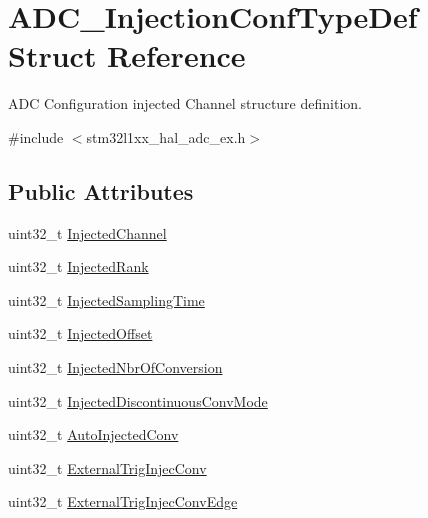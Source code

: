 \hypertarget{struct_a_d_c___injection_conf_type_def}{\section{A\-D\-C\-\_\-\-Injection\-Conf\-Type\-Def Struct Reference}
\label{struct_a_d_c___injection_conf_type_def}
}


A\-D\-C Configuration injected Channel structure definition.  




{\ttfamily \#include $<$stm32l1xx\-\_\-hal\-\_\-adc\-\_\-ex.\-h$>$}

\subsection*{Public Attributes}
\begin{DoxyCompactItemize}
\item 
uint32\-\_\-t \hyperlink{struct_a_d_c___injection_conf_type_def_aad0cab6ed3f66e8ffa4bd0490298b715}{Injected\-Channel}
\item 
uint32\-\_\-t \hyperlink{struct_a_d_c___injection_conf_type_def_af8a1717c0f5a5d0c7a705224f28a844f}{Injected\-Rank}
\item 
uint32\-\_\-t \hyperlink{struct_a_d_c___injection_conf_type_def_a3d15c0590dbafc9e99e21ea4df5b0c6b}{Injected\-Sampling\-Time}
\item 
uint32\-\_\-t \hyperlink{struct_a_d_c___injection_conf_type_def_ac7d28d71ec3aec4d1587ee04fc585f09}{Injected\-Offset}
\item 
uint32\-\_\-t \hyperlink{struct_a_d_c___injection_conf_type_def_ac59f9795b1b8c4ce6745d99f8231b768}{Injected\-Nbr\-Of\-Conversion}
\item 
uint32\-\_\-t \hyperlink{struct_a_d_c___injection_conf_type_def_adf871acec9ab869d14b5d58e1549739b}{Injected\-Discontinuous\-Conv\-Mode}
\item 
uint32\-\_\-t \hyperlink{struct_a_d_c___injection_conf_type_def_ab0e74342214a5610e6b4f1f080f10544}{Auto\-Injected\-Conv}
\item 
uint32\-\_\-t \hyperlink{struct_a_d_c___injection_conf_type_def_ac3431d4d3e3089f0db271bfb06dbffc0}{External\-Trig\-Injec\-Conv}
\item 
uint32\-\_\-t \hyperlink{struct_a_d_c___injection_conf_type_def_a4f2cfa808b5ace1e47fc3f94da7b850f}{External\-Trig\-Injec\-Conv\-Edge}
\end{DoxyCompactItemize}


